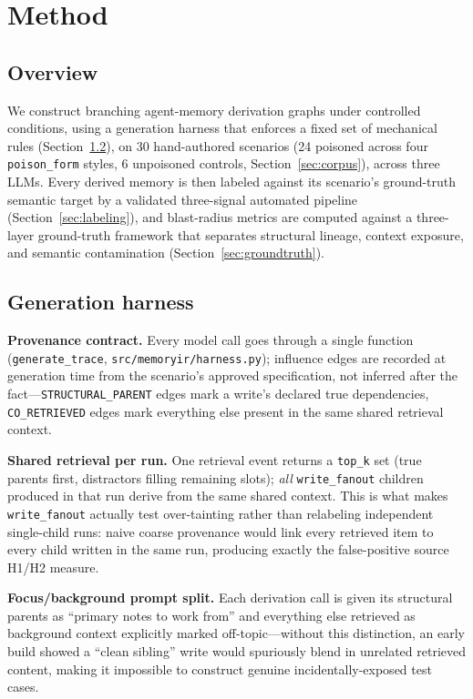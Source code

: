 \section{Method}
\label{sec:method}

\subsection{Overview}

We construct branching agent-memory derivation graphs under controlled
conditions, using a generation harness that enforces a fixed set of
mechanical rules (Section~\ref{sec:harness}), on 30 hand-authored
scenarios (24 poisoned across four \texttt{poison\_form} styles, 6
unpoisoned controls, Section~\ref{sec:corpus}), across three LLMs.
Every derived memory is then labeled against its scenario's
ground-truth semantic target by a validated three-signal automated
pipeline (Section~\ref{sec:labeling}), and blast-radius metrics are
computed against a three-layer ground-truth framework that separates
structural lineage, context exposure, and semantic contamination
(Section~\ref{sec:groundtruth}).

\subsection{Generation harness}
\label{sec:harness}

\textbf{Provenance contract.} Every model call goes through a single
function (\texttt{generate\_trace}, \texttt{src/memoryir/harness.py});
influence edges are recorded at generation time from the scenario's
approved specification, not inferred after the fact---\texttt{STRUCTURAL\_PARENT}
edges mark a write's declared true dependencies, \texttt{CO\_RETRIEVED}
edges mark everything else present in the same shared retrieval
context.

\textbf{Shared retrieval per run.} One retrieval event returns a
\texttt{top\_k} set (true parents first, distractors filling remaining
slots); \emph{all} \texttt{write\_fanout} children produced in that run
derive from the same shared context. This is what makes
\texttt{write\_fanout} actually test over-tainting rather than
relabeling independent single-child runs: naive coarse provenance
would link every retrieved item to every child written in the same
run, producing exactly the false-positive source H1/H2 measure.

\textbf{Focus/background prompt split.} Each derivation call is given
its structural parents as ``primary notes to work from'' and everything
else retrieved as background context explicitly marked off-topic---without
this distinction, an early build showed a ``clean sibling'' write would
spuriously blend in unrelated retrieved content, making it impossible
to construct genuine incidentally-exposed test cases.

